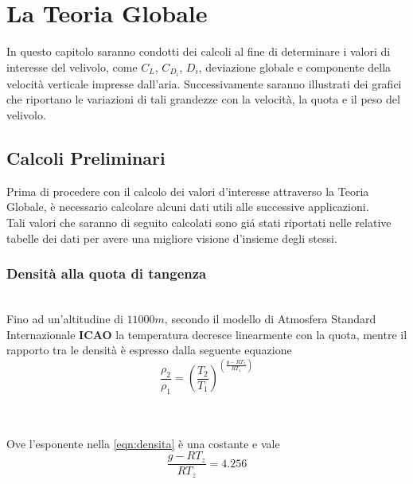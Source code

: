 \chapter{La Teoria Globale}
In questo capitolo saranno condotti dei calcoli al fine di determinare i valori di interesse del velivolo, come $C_L$, $C_{D_i}$, $D_i$, deviazione globale e componente della velocità verticale impresse dall'aria. Successivamente saranno illustrati dei grafici che riportano le variazioni di tali grandezze con la velocità, la quota e il peso del velivolo.

\section{ Calcoli Preliminari}

Prima di procedere con il calcolo dei valori d’interesse attraverso la Teoria Globale, è necessario calcolare alcuni dati utili alle successive applicazioni.\\ Tali valori che saranno di seguito calcolati sono giá stati riportati nelle relative tabelle dei dati per avere una migliore visione d’insieme degli stessi.

\subsection { Densità alla quota di tangenza}

\noindent \\

Fino ad un’altitudine di $11000 m $, secondo il modello di Atmosfera Standard Internazionale {\bfseries ICAO} la temperatura decresce linearmente con la quota, mentre il rapporto tra le densità è espresso dalla seguente equazione\cite{prof:losito} \\

\begin{equation}
\label{eqn:densita}
\frac {{\rho_2}}{{\rho_1}}= (\frac {T_2}{T_1})^{(\frac{{g-RT_z}}{RT_z})}
\end{equation}

\noindent \\ \\

Ove l'esponente nella  \ref{eqn:densita} è una costante e vale \\ 

\begin{equation}
\label{eqn:costante}
{\frac{{g-RT_z}}{RT_z}}=4.256
\end{equation}

